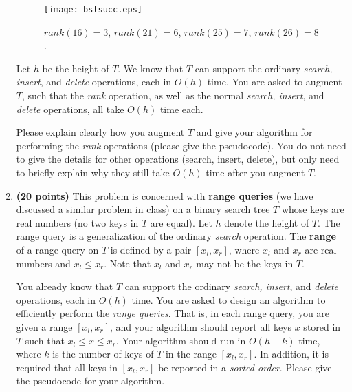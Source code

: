\documentclass[11pt]{article}
\begin{document}
\begin{enumerate}
\begin{figure}[h]
\begin{minipage}[t]{\linewidth}
\begin{center}
\texttt{[image: bstsucc.eps]}
\caption{\footnotesize
$rank(16)=3$, $rank(21)=6$, $rank(25)=7$, $rank(26)=8$.
}
\label{fig:bstsucc}
\end{center}
\end{minipage}
\vspace*{-0.10in}
\end{figure}

Let $h$ be the height of $T$. We know that $T$ can support the ordinary {\em search, insert}, and {\em delete} operations, each in $O(h)$ time. You are asked to augment $T$, such that the {\em rank} operation, as well as the normal {\em search, insert}, and {\em delete} operations, all take $O(h)$ time each.

Please explain clearly how you augment $T$ and give your algorithm for performing the {\em rank} operations (please give the pseudocode). You do not need to give the details for other operations (search, insert, delete), but only need to briefly explain why they still take $O(h)$ time after you augment $T$.




\item
{\bf (20 points)}
This problem is concerned with {\bf range queries} (we have discussed a similar problem in class) on a binary search tree $T$ whose keys are real numbers (no two keys in $T$ are equal). Let $h$ denote the height of $T$. The range query is a generalization of the ordinary {\em search} operation. The {\bf range} of a range query on $T$ is defined by a pair $[x_l,x_r]$, where $x_l$ and $x_r$ are real numbers and $x_l\leq x_r$. Note that $x_l$ and $x_r$ may not be the keys in $T$.

You already know that $T$ can support the ordinary {\em search, insert}, and {\em delete} operations, each in $O(h)$ time. You are asked to design an algorithm to efficiently perform the {\em range queries}. That is, in each range query, you are given a range $[x_l,x_r]$, and your algorithm should report all keys $x$ stored in $T$ such that $x_l\leq x\leq x_r$. Your algorithm should run in $O(h+k)$ time, where $k$ is the number of keys of $T$ in the range $[x_l,x_r]$. In addition, it is required that all keys in $[x_l,x_r]$ be reported in a {\em sorted order}. Please give the pseudocode for your algorithm.

\vspace{-0.13in}

\end{enumerate}
\end{document}
